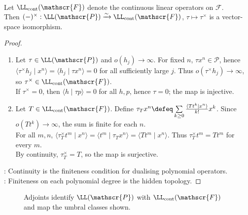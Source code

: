 \begin{theorem} \label{thm:operator-adjoints-and-continuity-umbral} \\
Let $\LL_{\mathrm{cont}}(\mathscr{F})$ denote the continuous linear operators on $\mathscr{F}$.\\
Then $(-)^\times:\LL(\mathscr{P})\xrightarrow{\sim} \LL_{\mathrm{cont}}(\mathscr{F})$, $\tau\longmapsto\tau^\times$ is a vector-space isomorphism.
\begin{proof}
\begin{enumerate}[label=\roman*.]
\setlength{\itemsep}{0pt}
\item[$(\Rightarrow)$] Let $\tau\in\LL(\mathscr{P})$ and $o(h_j)\to\infty$.
For fixed $n$, $\tau x^n\in\mathscr{P}$, hence $\langle \tau^\times h_j\mid x^n\rangle =\langle h_j\mid \tau x^n\rangle=0$ for all sufficiently large $j$. Thus $o(\tau^\times h_j)\to\infty$, so $\tau^\times\in\LL_{\mathrm{cont}}(\mathscr{F})$.\\
If $\tau^\times=0$, then $\langle h\mid \tau p\rangle=0$ for all $h,p$, hence $\tau=0$; the map is injective.
\item[$(\Leftarrow)$] Let $T\in\LL_{\mathrm{cont}}(\mathscr{F})$. Define $\tau_Tx^n\defeq \sum\limits_{k\geq0}\frac{\langle Tt^k\mid x^n\rangle}{k!}x^k$. Since $o(Tt^k)\to\infty$, the sum is finite for each $n$.\\
For all $m,n$, $\langle \tau_T^\times t^m\mid x^n\rangle =\langle t^m\mid \tau_Tx^n\rangle =\langle Tt^m\mid x^n\rangle$. Thus $\tau_T^\times t^m=Tt^m$ for every $m$.\\
By continuity, $\tau_T^\times=T$, so the map is surjective.
\end{enumerate}
: Continuity is the finiteness condition for dualising polynomial operators.\\
: Finiteness on each polynomial degree is the hidden topology.
\end{proof}
\end{theorem}

\begin{figure}[H]
  \centering
  
  \caption{Adjoints identify $\LL(\mathscr{P})$ with $\LL_{\mathrm{cont}}(\mathscr{F})$ and map the umbral classes shown.}
  \label{fig:umbral-operator-adjoint-correspondence}
\end{figure}

